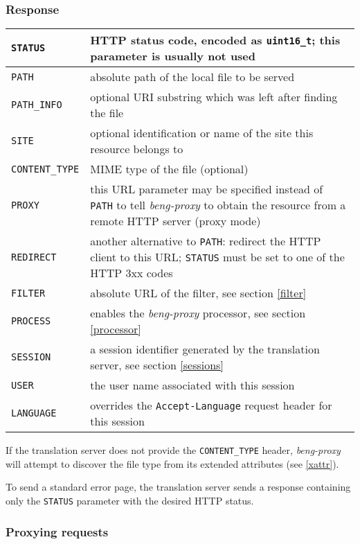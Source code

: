 \documentclass[a4paper,12pt]{article}
\begin{document}
\subsubsection{Response}

\begin{tabular}{|l|p{10cm}|}
\hline
\texttt{STATUS} & HTTP status code, encoded as \texttt{uint16\_t};
this parameter is usually not used \\
\hline
\texttt{PATH} & absolute path of the local file to be served \\
\hline
\texttt{PATH\_INFO} & optional URI substring which was left after
finding the file \\
\hline
\texttt{SITE} & optional identification or name of the site this
resource belongs to \\
\hline
\texttt{CONTENT\_TYPE} & MIME type of the file (optional) \\
\hline
\texttt{PROXY} & this URL parameter may be specified instead of
\texttt{PATH} to tell \emph{beng-proxy} to obtain the resource from a
remote HTTP server (proxy mode) \\
\hline
\texttt{REDIRECT} & another alternative to \texttt{PATH}: redirect the
HTTP client to this URL; \texttt{STATUS} must be set to one of the
HTTP 3xx codes \\
\hline
\texttt{FILTER} & absolute URL of the filter, see section \ref{filter} \\
\hline
\texttt{PROCESS} & enables the \emph{beng-proxy} processor, see
section \ref{processor} \\
\hline
\texttt{SESSION} & a session identifier generated by the translation
server, see section \ref{sessions} \\
\hline
\texttt{USER} & the user name associated with this session \\
\hline
\texttt{LANGUAGE} & overrides the \texttt{Accept-Language} request
header for this session \\
\hline
\end{tabular}

If the translation server does not provide the \texttt{CONTENT\_TYPE}
header, \emph{beng-proxy} will attempt to discover the file type from
its extended attributes (see \ref{xattr}).

To send a standard error page, the translation server sends a response
containing only the \texttt{STATUS} parameter with the desired HTTP
status.

\subsubsection{Proxying requests}
\end{document}
